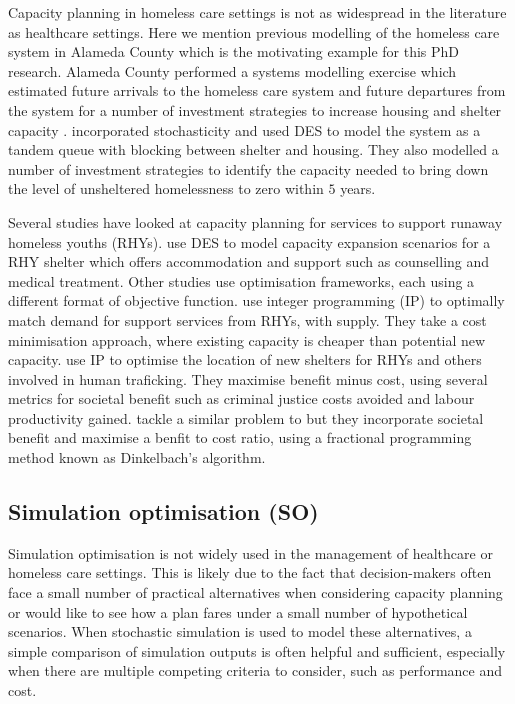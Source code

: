 \documentclass[12pt,a4paper]{article}
\begin{document}
Capacity planning in homeless care settings is not as widespread in the literature as healthcare settings. Here we mention previous modelling of the homeless care system in Alameda County which is the motivating example for this PhD research. Alameda County performed a systems modelling exercise which estimated future arrivals to the homeless care system and future departures from the system for a number of investment strategies to increase housing and shelter capacity \citep{hometogether2022}. \cite{singham2023discrete} incorporated stochasticity and used DES to model the system as a tandem queue with blocking between shelter and housing. They also modelled a number of investment strategies to identify the capacity needed to bring down the level of unsheltered homelessness to zero within $5$ years.

Several studies have looked at capacity planning for services to support runaway homeless youths (RHYs). \cite{kaya2022discrete} use DES to model capacity expansion scenarios for a RHY shelter which offers accommodation and support such as counselling and medical treatment. Other studies use optimisation frameworks, each using a different format of objective function. \cite{kaya2022improving} use integer programming (IP) to optimally match demand for support services from RHYs, with supply. They take a cost minimisation approach, where existing capacity is cheaper than potential new capacity. \cite{maass2020optimizing} use IP to optimise the location of new shelters for RHYs and others involved in human traficking. They maximise benefit minus cost, using several metrics for societal benefit such as criminal justice costs avoided and labour productivity gained. \cite{miller2022optimization} tackle a similar problem to \cite{kaya2022improving} but they incorporate societal benefit and maximise a benfit to cost ratio, using a fractional programming method known as Dinkelbach's algorithm. 

\subsection{Simulation optimisation (SO)} \label{so}

Simulation optimisation is not widely used in the management of healthcare or homeless care settings. This is likely due to the fact that decision-makers often face a small number of practical alternatives when considering capacity planning or would like to see how a plan fares under a small number of hypothetical scenarios. When stochastic simulation is used to model these alternatives, a simple comparison of simulation outputs is often helpful and sufficient, especially when there are multiple competing criteria to consider, such as performance and cost.
\end{document}
